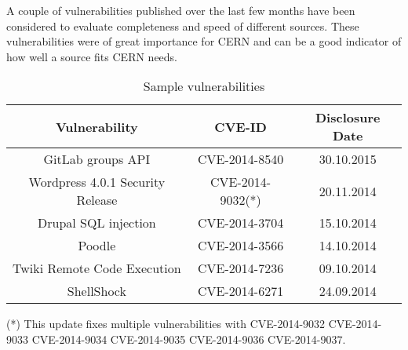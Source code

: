 A couple of vulnerabilities published over the last few months have been considered to evaluate completeness and speed of different sources. These vulnerabilities were of great importance for CERN and can be a good indicator of how well a source fits CERN needs.
\begin{table}
\begin{center}
    \begin{tabular}{ | c | c | c| }
    
    \hline
    Vulnerability & CVE-ID & Disclosure Date 
    \\ \hline
    GitLab groups API & CVE-2014-8540 & 30.10.2015
      \\ \hline
    Wordpress 4.0.1 Security Release & CVE-2014-9032(*)  & 20.11.2014
    \\ \hline
    Drupal SQL injection
 & CVE-2014-3704
 & 15.10.2014 
  \\
    \hline

 Poodle
 & CVE-2014-3566
 & 14.10.2014
  \\
    \hline

Twiki Remote Code Execution
 & CVE-2014-7236
 & 09.10.2014
 \\
    \hline

ShellShock
 & CVE-2014-6271
 & 24.09.2014
  \\
    \hline

    \end{tabular}
    \caption{Sample vulnerabilities}
   \end{center}
    \footnotesize{(*) This update fixes multiple vulnerabilities with CVE-2014-9032 CVE-2014-9033 CVE-2014-9034 CVE-2014-9035 CVE-2014-9036 CVE-2014-9037.}
\end{table}


